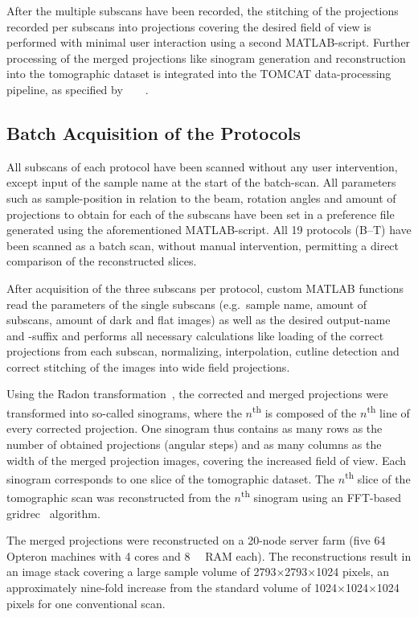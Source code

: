 After the multiple subscans have been recorded, the stitching of the projections recorded per subscans into projections covering the desired field of view is performed with minimal user interaction using a second MATLAB-script. Further processing of the merged projections like sinogram generation and reconstruction into the tomographic dataset is integrated into the TOMCAT data-processing pipeline, as specified by%
\ifhtml%
	~\citet{Hintermueller2009}%
\else%
	~%
\fi%
.

\subsection{Batch Acquisition of the Protocols}%
All subscans of each protocol have been scanned without any user intervention, except input of the sample name at the start of the batch-scan. All parameters such as sample-position in relation to the beam, rotation angles and amount of projections to obtain for each of the subscans have been set in a preference file generated using the aforementioned MATLAB-script. All 19 protocols (B--T) have been scanned as a batch scan, without manual intervention, permitting a direct comparison of the reconstructed slices.

After acquisition of the three subscans per protocol, custom MATLAB functions read the parameters of the single subscans (e.g.\ sample name, amount of subscans, amount of dark and flat images) as well as the desired output-name and -suffix and performs all necessary calculations like loading of the correct projections from each subscan, normalizing, interpolation, cutline detection and correct stitching of the images into wide field projections.

Using the Radon transformation~\cite{Radon1917}, the corrected and merged projections were transformed into so-called sinograms, where the $n$\textsuperscript{th} is composed of the $n$\textsuperscript{th} line of every corrected projection. One sinogram thus contains as many rows as the number of obtained projections (angular steps) and as many columns as the width of the merged projection images, covering the increased field of view. Each sinogram corresponds to one slice of the tomographic dataset. The $n$\textsuperscript{th} slice of the tomographic scan was reconstructed from the $n$\textsuperscript{th} sinogram using an FFT-based gridrec~\cite{Dowd1999} algorithm.

The merged projections were reconstructed on a 20-node server farm (five \SI{64}{\bit} Opteron machines with 4 cores and \SI{8}{\giga\byte} RAM each). The reconstructions result in an image stack covering a large sample volume of 2793$\times$2793$\times$1024 pixels, an approximately nine-fold increase from the standard volume of 1024$\times$1024$\times$1024 pixels for one conventional scan.